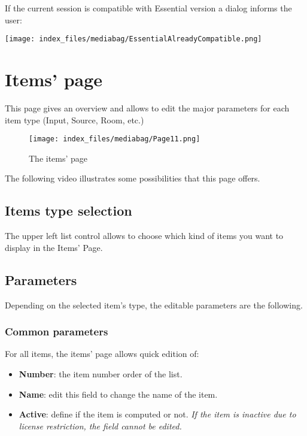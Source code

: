 \documentclass[
  letterpaper,
  DIV=11,
  numbers=noendperiod]{scrreport}
\providecommand{\tightlist}{%
  \setlength{\itemsep}{0pt}\setlength{\parskip}{0pt}}\usepackage{longtable,booktabs,array}
\begin{document}
If the current session is compatible with Essential version a dialog
informs the user:

\texttt{[image: index\_files/mediabag/EssentialAlreadyCompatible.png]}

\hypertarget{items-page}{%
\chapter{Items' page}\label{items-page}}

This page gives an overview and allows to edit the major parameters for
each item type (Input, Source, Room, etc.)

\begin{figure}

{\centering \texttt{[image: index\_files/mediabag/Page11.png]}

}

\caption{The items' page}

\end{figure}

The following video illustrates some possibilities that this page
offers.

\hypertarget{items-type-selection}{%
\section{Items type selection}\label{items-type-selection}}

The upper left list control allows to choose which kind of items you
want to display in the Items' Page.

\hypertarget{parameters}{%
\section{Parameters}\label{parameters}}

Depending on the selected item's type, the editable parameters are the
following.

\hypertarget{common-parameters}{%
\subsection{Common parameters}\label{common-parameters}}

For all items, the items' page allows quick edition of:

\begin{itemize}
\tightlist
\item
  \textbf{Number}: the item number order of the list.
\item
  \textbf{Name}: edit this field to change the name of the item.
\item
  \textbf{Active}: define if the item is computed or not. \emph{If the
  item is inactive due to license restriction, the field cannot be
  edited.}
\end{itemize}
\end{document}
